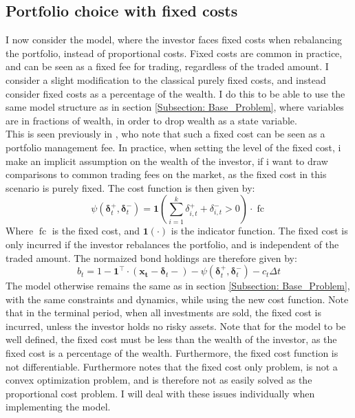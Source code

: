 \documentclass[11pt]{article}
\begin{document}
\subsection{Portfolio choice with fixed costs}
I now consider the model, where the investor faces fixed costs when rebalancing the portfolio, instead of proportional costs.
Fixed costs are common in practice, and can be seen as a fixed fee for trading, regardless of the traded amount.
I consider a slight modification to the classical purely fixed costs, and instead consider fixed costs as a percentage of the wealth.
I do this to be able to use the same model structure as in section \ref{Subsection: Base_Problem}, where variables are in fractions of wealth,
in order to drop wealth as a state variable.\\
This is seen previously in \autocite{morton1995optimal}, who note that such a fixed cost can be seen as a portfolio management fee.
In practice, when setting the level of the fixed cost, i make an implicit assumption on the wealth of the investor,
if i want to draw comparisons to common trading fees on the market, as the fixed cost in this scenario is purely fixed.
The cost function is then given by:
\begin{equation}
  \label{eq:Fixed_Cost_Function}
  \psi (\boldsymbol{\delta}^{+}_{t}, \boldsymbol{\delta}^{-}_{t} ) = \mathbf{1} \left(  \sum^{k}_{i=1} \delta^{+}_{i,t} + \delta^{-}_{i,t}  > 0 \right) \cdot \operatorname{fc}
\end{equation}
Where $\operatorname{fc}$ is the fixed cost, and $\mathbf{1}(\cdot)$ is the indicator function.
The fixed cost is only incurred if the investor rebalances the portfolio, and is independent of the traded amount.
The normaized bond holdings are therefore given by:
\begin{equation}\label{eq: fx_bond_holdings}
  b_{t} = 1 - \mathbf{1}^{\top} \cdot (\mathbf{x_t} - \boldsymbol{\delta}_t -) - \psi( \boldsymbol{\delta}^{+}_{t}, \boldsymbol{\delta}^{-}_{t} ) - c_t \Delta t
\end{equation}
The model otherwise remains the same as in section \ref{Subsection: Base_Problem}, with the same constraints and dynamics, while using the new cost function.
Note that in the terminal period, when all investments are sold, the fixed cost is incurred, unless the investor holds no risky assets.
Note that for the model to be well defined, the fixed cost must be less than the wealth of the investor, as the fixed cost is a percentage of the wealth.
Furthermore, the fixed cost function is not differentiable. Furthermore \autocite{Dybvig2020} notes that the fixed cost only problem,
is not a convex optimization problem, and is therefore not as easily solved as the proportional cost problem. I will deal with these issues individually
when implementing the model.
\end{document}
